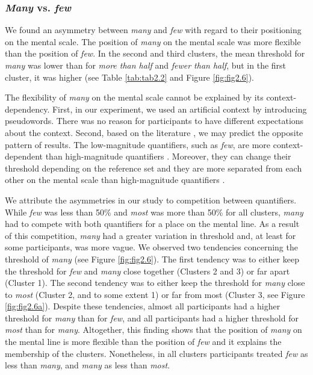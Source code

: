 \documentclass{article}
\begin{document}
\subsubsection{\textit{Many} vs. \textit{few}}
We found an asymmetry between \textit{many} and \textit{few} with regard to their positioning on the mental scale. The position of \textit{many} on the mental scale was more flexible than the position of \textit{few}. In the second and third clusters, the mean threshold for \textit{many} was lower than for \textit{more than half} and \textit{fewer than half}, but in the first cluster, it was higher (see Table \ref{tab:tab2.2} and Figure \ref{fig:fig2.6}). %

The flexibility of \textit{many} on the mental scale cannot be explained by its context-dependency. First, in our experiment, we used an artificial context by introducing pseudowords. There was no reason for participants to have different expectations about the context. 
Second, based on the literature \cite{Newstead1987TheScales}, we may predict the opposite pattern of results. The low-magnitude quantifiers, such as \textit{few}, are more context-dependent than high-magnitude quantifiers \cite{Newstead1987TheScales}. Moreover, they can change their threshold depending on the reference set \cite{Newstead1987TheScales} and they are more separated from each other on the mental scale than high-magnitude quantifiers \cite{Pezzelle2018}.

We attribute the asymmetries in our study to competition between quantifiers. While \textit{few} was less than 50\% and \textit{most} was more than 50\% for all clusters, \textit{many} had to compete with both quantifiers for a place on the mental line. As a result of this competition, \textit{many} had a greater variation in threshold and, at least for some participants, was more vague. We observed two tendencies concerning the threshold of \textit{many} (see Figure \ref{fig:fig2.6}). The first tendency was to either keep the threshold for \textit{few} and \textit{many} close together (Clusters 2 and 3) or far apart (Cluster 1). The second tendency was to either keep the threshold for \textit{many} close to \textit{most} (Cluster 2, and to some extent 1) or far from most (Cluster 3, see Figure \ref{fig:fig2.6a}). Despite these tendencies, almost all participants had a higher threshold for \textit{many} than for \textit{few}, and all participants had a higher threshold for \textit{most} than for \textit{many}. Altogether, this finding shows that the position of \textit{many} on the mental line is more flexible than the position of \textit{few} and it explains the membership of the clusters. Nonetheless, in all clusters participants treated \textit{few} as less than \textit{many}, and \textit{many} as less than \textit{most}.
\end{document}
